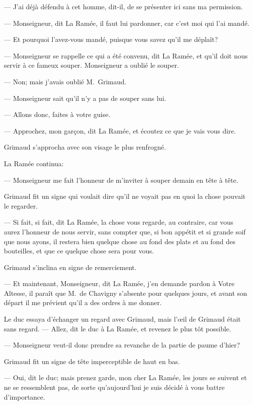 — J'ai déjà défendu à cet homme, dit-il, de se présenter ici sans ma permission.

— Monseigneur, dit La Ramée, il faut lui pardonner, car c'est moi qui l'ai mandé.

— Et pourquoi l'avez-vous mandé, puisque vous savez qu'il me déplaît?

— Monseigneur se rappelle ce qui a été convenu, dit La Ramée, et qu'il doit nous servir à ce fameux souper. Monseigneur a oublié le souper.

— Non; mais j'avais oublié M.~Grimaud.

— Monseigneur sait qu'il n'y a pas de souper sans lui.

— Allons donc, faites à votre guise.

— Approchez, mon garçon, dit La Ramée, et écoutez ce que je vais vous dire.

Grimaud s'approcha avec son visage le plus renfrogné.

La Ramée continua:

— Monseigneur me fait l'honneur de m'inviter à souper demain en tête à tête.

Grimaud fit un signe qui voulait dire qu'il ne voyait pas en quoi la chose pouvait le regarder.

— Si fait, si fait, dit La Ramée, la chose vous regarde, au contraire, car vous aurez l'honneur de nous servir, sans compter que, si bon appétit et si grande soif que nous ayons, il restera bien quelque chose au fond des plats et au fond des bouteilles, et que ce quelque chose sera pour vous.

Grimaud s'inclina en signe de remerciement.

— Et maintenant, Monseigneur, dit La Ramée, j'en demande pardon à Votre Altesse, il paraît que M.~de Chavigny s'absente pour quelques jours, et avant son départ il me prévient qu'il a des ordres à me donner.

Le duc essaya d'échanger un regard avec Grimaud, mais l'œil de Grimaud était sans regard.
— Allez, dit le duc à La Ramée, et revenez le plus tôt possible.

— Monseigneur veut-il donc prendre sa revanche de la partie de paume d'hier?

Grimaud fit un signe de tête imperceptible de haut en bas.

— Oui, dit le duc; mais prenez garde, mon cher La Ramée, les jours se suivent et ne se ressemblent pas, de sorte qu'aujourd'hui je suis décidé à vous battre d'importance.

